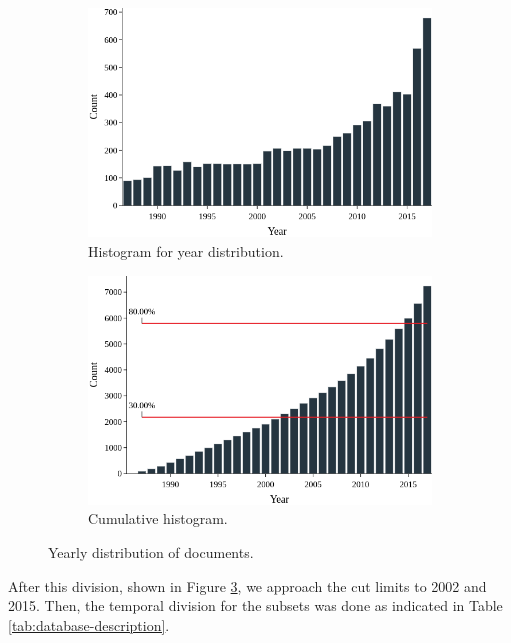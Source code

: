 \begin{figure}[h!]
	\begin{subfigure}{0.5\textwidth}
		\includegraphics[width=\linewidth]{01.Chapters/04.Materials/yearly-histogram}
		\caption{Histogram for year distribution.} \label{fig:yearly-histogram}
	\end{subfigure}%
	\hfill
	\begin{subfigure}{0.5\textwidth}
		\includegraphics[width=\linewidth]{01.Chapters/04.Materials/yearly-cumulative}
		\caption{Cumulative histogram.} \label{fig:yearly-cumulative}
	\end{subfigure}%
	\caption{Yearly distribution of documents.}
	\label{fig:yearly-distribution}
\end{figure}

After this division, shown in Figure \ref{fig:yearly-distribution}, we approach the cut limits to 2002 and 2015. Then, the temporal division for the subsets was done as indicated in Table \ref{tab:database-description}.

